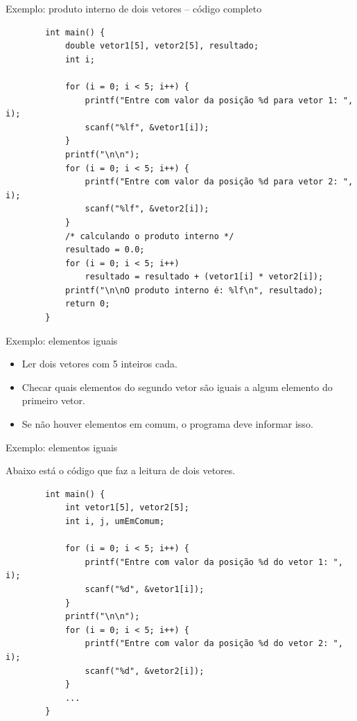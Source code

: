 \documentclass[handout]{beamer}
\begin{document}
\begin{frame}[fragile]{Exemplo: produto interno de dois vetores -- código completo}

    \begin{verbatim}
        int main() {
            double vetor1[5], vetor2[5], resultado;
            int i;

            for (i = 0; i < 5; i++) {
                printf("Entre com valor da posição %d para vetor 1: ", i);
                scanf("%lf", &vetor1[i]);
            }
            printf("\n\n");
            for (i = 0; i < 5; i++) {
                printf("Entre com valor da posição %d para vetor 2: ", i);
                scanf("%lf", &vetor2[i]);
            }
            /* calculando o produto interno */
            resultado = 0.0;
            for (i = 0; i < 5; i++)
                resultado = resultado + (vetor1[i] * vetor2[i]);
            printf("\n\nO produto interno é: %lf\n", resultado);
            return 0;
        }
    \end{verbatim}

\end{frame}

\begin{frame}[fragile]{Exemplo: elementos iguais}

    \begin{itemize}
        \item Ler dois vetores com 5 inteiros cada.
        \item Checar quais elementos do segundo vetor são iguais a algum elemento do primeiro vetor.
        \item Se não houver elementos em comum, o programa deve informar isso.
    \end{itemize}

\end{frame}

\begin{frame}[fragile]{Exemplo: elementos iguais}

    Abaixo está o código que faz a leitura de dois vetores.

    \begin{verbatim}
        int main() {
            int vetor1[5], vetor2[5];
            int i, j, umEmComum;

            for (i = 0; i < 5; i++) {
                printf("Entre com valor da posição %d do vetor 1: ", i);
                scanf("%d", &vetor1[i]);
            }
            printf("\n\n");
            for (i = 0; i < 5; i++) {
                printf("Entre com valor da posição %d do vetor 2: ", i);
                scanf("%d", &vetor2[i]);
            }
            ...
        }
    \end{verbatim}

\end{frame}
\end{document}
